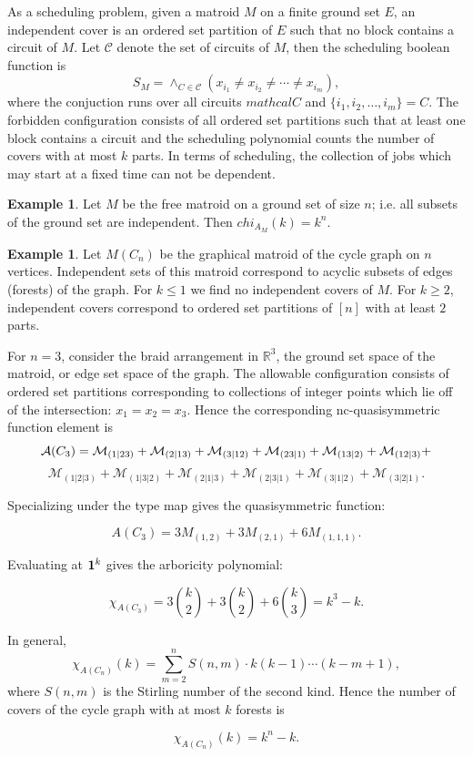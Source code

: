 \documentclass[12pt,reqno]{amsart}
\numberwithin{definition}{section}
\theoremstyle{definition}
\newtheorem{example}[definition]{Example}
\newcommand{\ncM}{\mathcal{M}}
\begin{document}
As a scheduling problem, given a matroid $M$ on a finite ground set
$E$, an independent cover is an ordered set partition of $E$ such
that no block contains a circuit of $M$. Let $\mathcal{C}$ denote the set of circuits of $M$, then the scheduling boolean function is
$$S_M = \wedge_{C \in \mathcal{C}} (x_{i_1} \neq x_{i_2} \neq \cdots \neq x_{i_m}),$$
where the conjuction runs over all circuits $mathcal{C}$ and $\{i_1, i_2, \ldots, i_m\} = C$.
The forbidden configuration consists of all ordered set partitions such that at least one block contains a circuit and the scheduling polynomial counts the number of covers with at most $k$ parts.   In terms of scheduling, the collection of jobs which may start at a fixed time can not be dependent.  

\begin{example}

Let $M$ be the free matroid on a ground set of size $n$; i.e. all subsets of the ground set are independent.  Then $chi_{A_M}(k) = k^n$.  

\end{example}

\begin{example}

Let $M(C_n)$ be the graphical matroid of the cycle graph on $n$
vertices.  Independent sets of this matroid correspond to acyclic
subsets of edges (forests) of the graph.  For $k \leq 1$ we find no
independent covers of $M$.  For $k \geq 2$, independent covers
correspond to ordered set partitions of $[n]$ with at least $2$ parts.


For $n=3$,  consider the braid arrangement in $\mathbb{R}^3$, the ground set space of the
matroid, or edge set space of the graph.  The allowable configuration consists of ordered set partitions
corresponding to collections of integer points which lie off of the
intersection: $x_1 = x_2 = x_3$. Hence the corresponding nc-quasisymmetric function element is 
$${\bf{{\mathcal A}}}(C_3) = \ncM_{(1|23)} + \ncM_{(2|13)} + \ncM_{(3|12)} + \ncM_{(23|1)} + \ncM_{(13|2)} +  \ncM_{(12|3)} + $$ $$ \ncM_{(1|2|3)} + \ncM_{(1|3|2)}
+ \ncM_{(2|1|3)} + \ncM_{(2|3|1)} + \ncM_{(3|1|2)} + \ncM_{(3|2|1)}. $$

\noindent Specializing under the type map gives the quasisymmetric function:

$${ A}(C_3) = 3 M_{(1,2)} + 3 M_{(2,1)} + 6 M_{(1,1,1)}. $$

\noindent Evaluating at ${\bf 1}^k $ gives the arboricity polynomial:

$$ \chi_{A(C_3)} = 3 { k \choose 2} + 3 { k \choose 2} + 6 { k \choose 3} = k^3 - k. $$

In general,
$$\chi_{A(C_n)}(k) = \sum_{m=2}^{n} S(n,m) \cdot k(k-1) \cdots (k-m+1), $$
where $S(n,m)$ is the Stirling number of the second kind. 
Hence the number of covers of the cycle graph with at most $k$ forests is

$$\chi_{A(C_n)}(k) = k^n - k. $$

\end{example}
\end{document}
